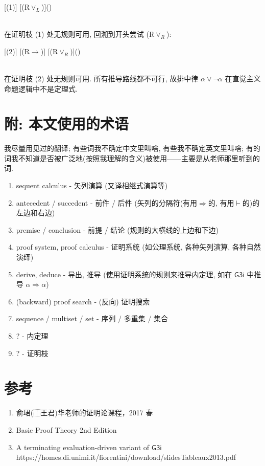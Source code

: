 \documentclass{article}
\def\To{\Rightarrow}
\def\a{\alpha}
\def\RVL{(R$\lor_L$)}
\def\RVR{(R$\lor_R$)}
\def\RI{(R$\to$)}
\def\Gthreei{$ \mathsf{G3i}$ }
\begin{document}
\begin{prooftree}[proof style=downwards]
	\Hypo{}
	[(1)]{\To \a}
	[\RVL]{\To \a\lor(\a\to\bot)}
\end{prooftree}\\

在证明枝 (1) 处无规则可用, 回溯到开头尝试 \RVR:\\

\begin{prooftree}[proof style=downwards]
	\Hypo{}
	[(2)]{\a \To \bot}
	[\RI]{\To \a\to\bot}
	[\RVR]{\To \a\lor(\a\to\bot)}
\end{prooftree}\\

在证明枝 (2) 处无规则可用. 所有推导路线都不可行, 故排中律 $\a\lor\neg\a$ 在直觉主义命题逻辑中不是定理式.

\section*{附: 本文使用的术语}

我尽量用见过的翻译; 有些词我不确定中文里叫啥, 有些我不确定英文里叫啥; 有的词我不知道是否被广泛地(按照我理解的含义)被使用——主要是从老师那里听到的词.

\begin{enumerate}
	\item sequent calculus - 矢列演算 (又译相继式演算等)
	\item antecedent / succedent - 前件 / 后件 (矢列的分隔符(有用$\To$的, 有用$\vdash$的)的左边和右边)
	\item premise / conclusion -  前提 / 结论 (规则的大横线的上边和下边)
	\item proof system, proof calculus - 证明系统 (如公理系统, 各种矢列演算, 各种自然演绎)
	\item derive, deduce - 导出, 推导 (使用证明系统的规则来推导内定理, 如在 \Gthreei 中推导 $\a\To\a$)
	\item (backward) proof search - (反向) 证明搜索 
	\item sequence / multiset / set - 序列 / 多重集 / 集合
	\item ? - 内定理
	\item ? - 证明枝
\end{enumerate}


\section*{参考}


\begin{enumerate}
	\item 俞珺(⿰王君)华老师的证明论课程，2017 春
	\item Basic Proof Theory 2nd Edition
	\item A terminating evaluation-driven variant of \Gthreei  https://homes.di.unimi.it/fiorentini/download/slidesTableaux2013.pdf
\end{enumerate}
\end{document}
